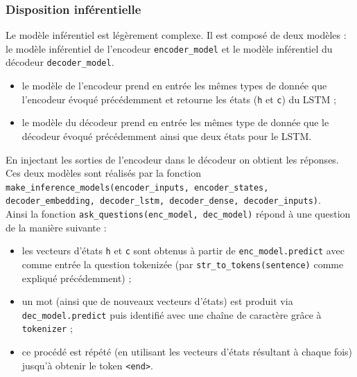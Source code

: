 \documentclass[10pt,a4paper]{article}
\newcommand\tab[1][0.5cm]{\hspace*{#1}}
\begin{document}
\subsubsection{Disposition inférentielle}
Le modèle inférentiel est légèrement complexe. Il est composé de deux modèles : le modèle inférentiel de l'encodeur \texttt{encoder\_model} et le modèle inférentiel du décodeur \texttt{decoder\_model}.
\begin{itemize}
	\item le modèle de l'encodeur prend en entrée les mêmes types de donnée que l'encodeur évoqué précédemment et retourne les états (\texttt{h} et \texttt{c}) du LSTM ;
	\item le modèle du décodeur prend en entrée les mêmes type de donnée que le décodeur évoqué précédemment ainsi que deux états pour le LSTM.
\end{itemize}
En injectant les sorties de l'encodeur dans le décodeur on obtient les réponses. Ces deux modèles sont réalisés par la fonction \texttt{make\_inference\_models(encoder\_inputs, encoder\_states, decoder\_embedding, decoder\_lstm, decoder\_dense, decoder\_inputs)}. \\
\tab Ainsi la fonction \texttt{ask\_questions(enc\_model, dec\_model)} répond à une question de la manière suivante :
\begin{itemize}
	\item les vecteurs d'états \texttt{h} et \texttt{c} sont obtenus à partir de \texttt{enc\_model.predict} avec comme entrée la question tokenizée (par \texttt{str\_to\_tokens(sentence)} comme expliqué précédemment) ;
	\item un mot (ainsi que de nouveaux vecteurs d'états) est produit via \texttt{dec\_model.predict} puis identifié avec une chaîne de caractère grâce à \texttt{tokenizer} ;
	\item ce procédé est répété (en utilisant les vecteurs d'états résultant à chaque fois) jusqu'à obtenir le token \texttt{<end>}.
\end{itemize}
\end{document}
